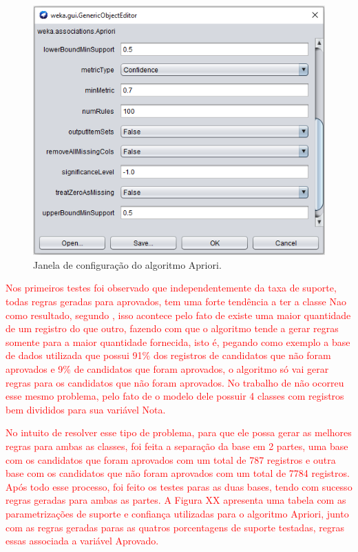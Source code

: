 \par
\begin{figure}[!htp]
	\begin{center}
    \caption{\label{fig:waveform_fig} Janela de configuração do algoritmo Apriori.}
	\includegraphics[scale=0.70]{Figuras/Janela_configuracao_apriori.png}
	\end{center}
\end{figure}


\par
\textcolor{red}{Nos primeiros testes foi observado que independentemente da taxa de suporte, todas regras geradas para aprovados, tem uma forte tendência a ter a classe Nao como resultado, segundo , isso acontece pelo fato de existe uma maior quantidade de um registro do que outro, fazendo com que o algoritmo tende a gerar regras somente para a maior quantidade fornecida, isto é, pegando como exemplo a base de dados utilizada que possui  91\% dos registros de candidatos que não foram aprovados e 9\% de candidatos que foram aprovados, o algoritmo só vai gerar regras para os candidatos que não foram aprovados. No trabalho de  não ocorreu esse mesmo problema, pelo fato de o modelo dele possuir 4 classes com registros bem divididos para sua variável Nota.}


\par
\textcolor{red}{No intuito de resolver esse tipo de problema, para que ele possa gerar as melhores regras para ambas as classes, foi feita a separação da base em 2 partes, uma base com os candidatos que foram aprovados com um total de 787 registros e outra base com os candidatos que não foram aprovados com um total de 7784 registros. Após todo esse processo, foi feito os testes paras as duas bases, tendo com sucesso regras geradas para ambas as partes. A Figura XX apresenta uma tabela com as parametrizações de suporte e confiança utilizadas para o algoritmo Apriori, junto com as regras geradas paras as quatros porcentagens de suporte testadas, regras essas associada a variável Aprovado.}


